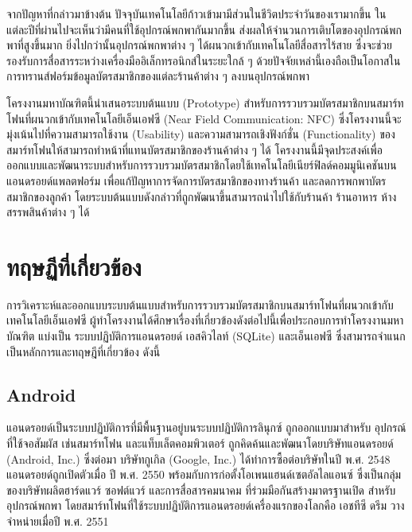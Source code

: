 \documentclass[a4paper]{article}
\begin{document}
จากปัญหาที่กล่าวมาข้างต้น ปัจจุบันเทคโนโลยีก้าวเข้ามามีส่วนในชีวิตประจำวันของเรามากขึ้น ในแต่ละปีที่ผ่านไปจะเห็นว่ามีคนที่ใช้อุปกรณ์พกพากันมากขึ้น ส่งผลให้จำนวนการเติบโตของอุปกรณ์พกพาที่สูงขึ้นมาก ยิ่งไปกว่านั้นอุปกรณ์พกพาต่าง ๆ ได้ผนวกเข้ากับเทคโนโลยีสื่อสารไร้สาย ซึ่งจะช่วยรองรับการสื่อสารระหว่างเครื่องมืออิเล็กทรอนิกส์ในระยะใกล้ ๆ ด้วยปัจจัยเหล่านี้เองถือเป็นโอกาสในการทรานส์ฟอร์มข้อมูลบัตรสมาชิกของแต่ละร้านค้าต่าง ๆ ลงบนอุปกรณ์พกพา

โครงงานมหาบัณฑิตนี้นำเสนอระบบต้นแบบ (Prototype) สำหรับการรวบรวมบัตรสมาชิกบนสมาร์ทโฟนที่ผนวกเข้ากับเทคโนโลยีเอ็นเอฟซี (Near Field Communication: NFC) ซึ่งโครงงานนี้จะมุ่งเน้นไปที่ความสามารถใช้งาน (Usability) และความสามารถเชิงฟังก์ชั่น (Functionality) ของสมาร์ทโฟนให้สามารถทำหน้าที่แทนบัตรสมาชิกของร้านค้าต่าง ๆ ได้ โครงงานนี้มีจุดประสงค์เพื่อออกแบบและพัฒนาระบบสำหรับการรวบรวมบัตรสมาชิกโดยใช้เทคโนโลยีเนียร์ฟิลด์คอมมูนิเคชันบนแอนดรอยด์แพลตฟอร์ม เพื่อแก้ปัญหาการจัดการบัตรสมาชิกของทางร้านค้า และลดการพกพาบัตรสมาชิกของลูกค้า โดยระบบต้นแบบดังกล่าวที่ถูกพัฒนาขึ้นสามารถนำไปใช้กับร้านค้า ร้านอาหาร ห้างสรรพสินค้าต่าง ๆ ได้


\section{ทฤษฏีที่เกี่ยวข้อง}

การวิเคราะห์และออกแบบระบบต้นแบบสำหรับการรวบรวมบัตรสมาชิกบนสมาร์ทโฟนที่ผนวกเข้ากับเทคโนโลยีเอ็นเอฟซี ผู้ทำโครงงานได้ศึกษาเรื่องที่เกี่ยวข้องดังต่อไปนี้เพื่อประกอบการทําโครงงานมหาบัณฑิต แบ่งเป็น ระบบปฏิบัติการแอนดรอยด์ เอสคิวไลท์ (SQLite) และเอ็นเอฟซี ซึ่งสามารถจําแนกเป็นหลักการและทฤษฎีที่เกี่ยวข้อง ดังนี้

\subsection{Android}
แอนดรอยด์เป็นระบบปฏิบัติการที่มีพื้นฐานอยู่บนระบบปฏิบัติการลินุกซ์ ถูกออกแบบมาสำหรับ \newline อุปกรณ์ที่ใช้จอสัมผัส เช่นสมาร์ทโฟน และแท็บเล็ตคอมพิวเตอร์ ถูกคิดค้นและพัฒนาโดยบริษัทแอนดรอยด์ (Android, Inc.) ซึ่งต่อมา บริษัทกูเกิล (Google, Inc.) ได้ทำการซื้อต่อบริษัทในปี พ.ศ. 2548 แอนดรอยด์ถูกเปิดตัวเมื่อ ปี พ.ศ. 2550 พร้อมกับการก่อตั้งโอเพนแฮนด์เซตอัลไลแอนซ์ ซึ่งเป็นกลุ่มของบริษัทผลิตฮาร์ดแวร์ ซอฟต์แวร์ และการสื่อสารคมนาคม ที่ร่วมมือกันสร้างมาตรฐานเปิด สำหรับอุปกรณ์พกพา โดยสมาร์ทโฟนที่ใช้ระบบปฏิบัติการแอนดรอยด์เครื่องแรกของโลกคือ เอชทีซี ดรีม วางจำหน่ายเมื่อปี พ.ศ. 2551
\end{document}
